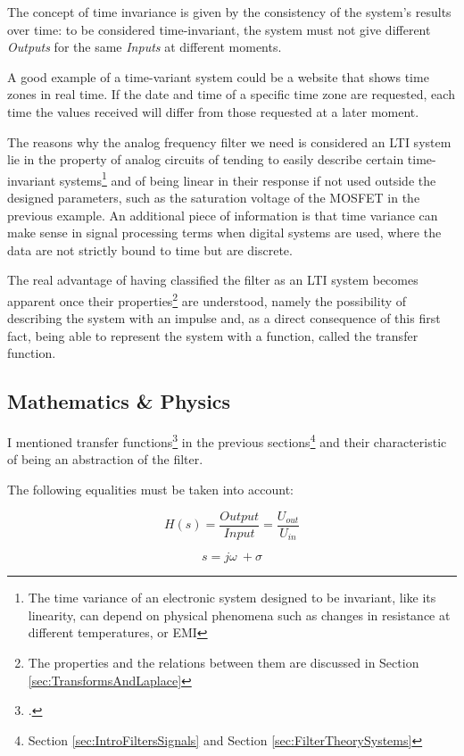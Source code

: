 \documentclass[a4paper, 10pt, final]{article} %
\begin{document}
    The concept of time invariance is given by the consistency of the system's results over time: to be considered time-invariant, the system must not give different \emph{Outputs} for the same \emph{Inputs} at different moments.

    A good example of a time-variant system could be a website that shows time zones in real time.
    If the date and time of a specific time zone are requested, each time the values received will differ from those requested at a later moment.


    The reasons why the analog frequency filter we need is considered an LTI system lie in the property of analog circuits of tending to easily describe certain time-invariant systems\footnote{The time variance of an electronic system designed to be invariant, like its linearity, can depend on physical phenomena such as changes in resistance at different temperatures, or EMI} and of being linear in their response if not used outside the designed parameters, such as the saturation voltage of the MOSFET in the previous example.
    An additional piece of information is that time variance can make sense in signal processing terms when digital systems are used, where the data are not strictly bound to time but are discrete.

    The real advantage of having classified the filter as an LTI system becomes apparent once their properties\footnote{The properties and the relations between them are discussed in Section \ref{sec:TransformsAndLaplace}} are understood, namely the possibility of describing the system with an impulse and, as a direct consequence of this first fact, being able to represent the system with a function, called the transfer function.
    \clearpage

    \subsection{Mathematics \& Physics} \label{sec:MathAndPhysics}
    I mentioned transfer functions\footcite[]{TransferFunction:Wiki} in the previous sections\footnote{Section \ref{sec:IntroFiltersSignals} and Section \ref{sec:FilterTheorySystems}} and their characteristic of being an abstraction of the filter.
    \begin{samepage}
        The following equalities must be taken into account:
        \begin{figure}[H]
            \centering
            \begin{minipage}[b]{.35\linewidth}
                \centering
                \[
                    H(s) = \frac{Output}{Input} = \frac{U_{out}}{U_{in}}
                \]
            \end{minipage}
            \begin{minipage}[b]{.35\linewidth}
                \centering
                \[
                    s = j\omega\ + \sigma
                \]
            \end{minipage}
        \end{figure}
    \end{samepage}
\end{document}
